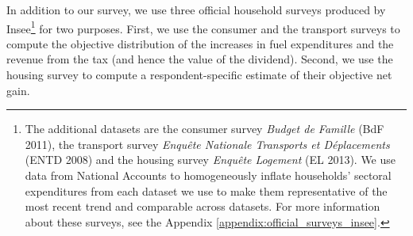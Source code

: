 \documentclass[12pt]{article} %
\begin{document}
In addition to our survey, we use three official household surveys produced by Insee\footnote{The additional datasets are the consumer survey \emph{Budget de Famille} (BdF 2011), the transport survey \emph{Enquête Nationale Transports et Déplacements} (ENTD 2008) and the housing survey \emph{Enquête Logement} (EL 2013). We use data from National Accounts to homogeneously inflate households’ sectoral expenditures from each dataset we use to make them representative of the most recent trend and comparable across datasets. For more information about these surveys, see the Appendix \ref{appendix:official_surveys_insee}.} for two purposes. First, we use the consumer and the transport surveys to compute the objective distribution of the increases in fuel expenditures and the revenue from the tax (and hence the value of the dividend). Second, we use the housing survey to compute a respondent-specific estimate of their objective net gain.



\end{document}
